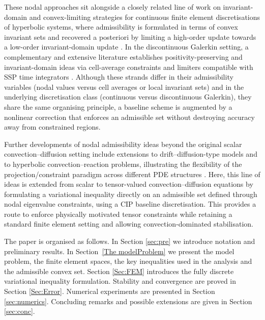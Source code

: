 \documentclass[final,12pt]{amsart}
\theoremstyle{plain}
\theoremstyle{definition}
\begin{document}
These nodal approaches sit alongside a closely related line of work on
invariant-domain and convex-limiting strategies for continuous finite
element discretisations of hyperbolic systems, where admissibility is
formulated in terms of convex invariant sets and recovered a
posteriori by limiting a high-order update towards a low-order
invariant-domain update
\cite{guermond2014second,guermond2016invariant,guermond2019invariant}.
In the discontinuous Galerkin setting, a complementary and extensive
literature establishes positivity-preserving and invariant-domain
ideas via cell-average constraints and limiters compatible with SSP
time integrators \cite{zhang2010positivity,zhang2011positivity}.
Although these strands differ in their admissibility variables (nodal
values versus cell averages or local invariant sets) and in the
underlying discretisation class (continuous versus discontinuous
Galerkin), they share the same organising principle, a baseline scheme
is augmented by a nonlinear correction that enforces an admissible set
without destroying accuracy away from constrained regions.

Further developments of nodal admissibility ideas beyond the original
scalar convection--diffusion setting include extensions to
drift--diffusion-type models and to hyperbolic convection--reaction
problems, illustrating the flexibility of the projection/constraint
paradigm across different PDE structures
\cite{barrenechea2025nodally,ashby2025nodally}.  Here, this line of
ideas is extended from scalar to tensor-valued convection--diffusion
equations by formulating a variational inequality directly on an
admissible set defined through nodal eigenvalue constraints, using a
CIP baseline discretisation. This provides a route to enforce
physically motivated tensor constraints while retaining a standard
finite element setting and allowing convection-dominated
stabilisation.

The paper is organised as follows. In Section \ref{sec:pre} we
introduce notation and preliminary results. In Section~\ref{The
  modelProblem} we present the model problem, the finite element
spaces, the key inequalities used in the analysis and the admissible
convex set. Section \ref{Sec:FEM} introduces the fully discrete
variational inequality formulation. Stability and convergence are
proved in Section \ref{Sec:Error}. Numerical experiments are presented
in Section \ref{sec:numerics}.  Concluding remarks and possible
extensions are given in Section \ref{sec:conc}.
\end{document}
